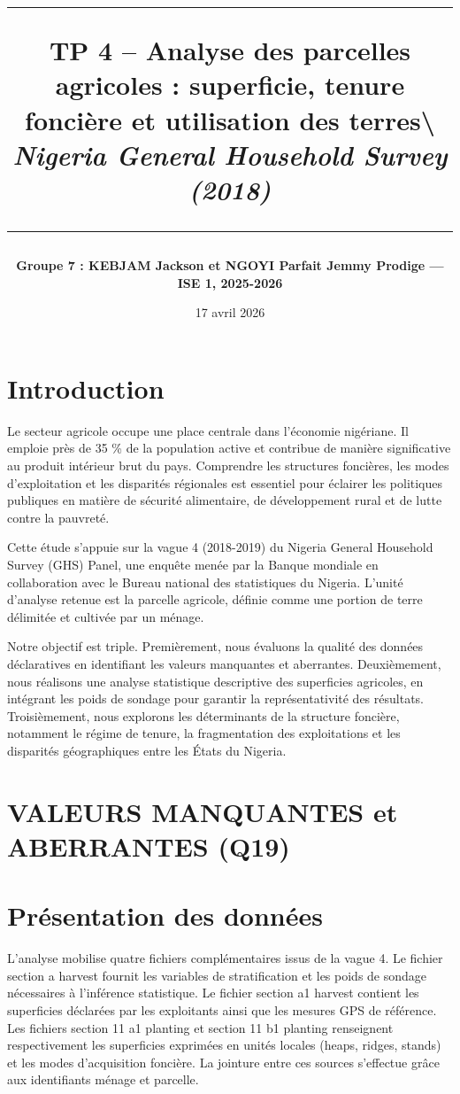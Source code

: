 \documentclass[
  french,
  10pt,
]{article}
\title{\vspace{-1cm}
\textcolor{NavyBlue}{\rule{\linewidth}{2pt}}
\vspace{0.3cm}

\textbf{TP 4 -- Analyse des parcelles agricoles : superficie, tenure foncière et utilisation des terres}\textbackslash{}
\large\textit{Nigeria General Household Survey (2018)} \vspace{0.2cm}

\textcolor{NavyBlue}{\rule{\linewidth}{0.5pt}}}
\author{\textbf{Groupe 7 : KEBJAM Jackson et NGOYI Parfait Jemmy Prodige — ISE 1, 2025-2026}}
\date{17 avril 2026}
\begin{document}
\maketitle

{
\setcounter{tocdepth}{3}
\tableofcontents
}
\section{Introduction}\label{introduction}

Le secteur agricole occupe une place centrale dans l'économie nigériane.
Il emploie près de 35 \% de la population active et contribue de manière
significative au produit intérieur brut du pays. Comprendre les
structures foncières, les modes d'exploitation et les disparités
régionales est essentiel pour éclairer les politiques publiques en
matière de sécurité alimentaire, de développement rural et de lutte
contre la pauvreté.

Cette étude s'appuie sur la vague 4 (2018-2019) du Nigeria General
Household Survey (GHS) Panel, une enquête menée par la Banque mondiale
en collaboration avec le Bureau national des statistiques du Nigeria.
L'unité d'analyse retenue est la parcelle agricole, définie comme une
portion de terre délimitée et cultivée par un ménage.

Notre objectif est triple. Premièrement, nous évaluons la qualité des
données déclaratives en identifiant les valeurs manquantes et
aberrantes. Deuxièmement, nous réalisons une analyse statistique
descriptive des superficies agricoles, en intégrant les poids de sondage
pour garantir la représentativité des résultats. Troisièmement, nous
explorons les déterminants de la structure foncière, notamment le régime
de tenure, la fragmentation des exploitations et les disparités
géographiques entre les États du Nigeria.

\section{VALEURS MANQUANTES et ABERRANTES
(Q19)}\label{valeurs-manquantes-et-aberrantes-q19}

\section{Présentation des données}\label{intro}

L'analyse mobilise quatre fichiers complémentaires issus de la vague 4.
Le fichier section a harvest fournit les variables de stratification et
les poids de sondage nécessaires à l'inférence statistique. Le fichier
section a1 harvest contient les superficies déclarées par les
exploitants ainsi que les mesures GPS de référence. Les fichiers section
11 a1 planting et section 11 b1 planting renseignent respectivement les
superficies exprimées en unités locales (heaps, ridges, stands) et les
modes d'acquisition foncière. La jointure entre ces sources s'effectue
grâce aux identifiants ménage et parcelle.
\end{document}
